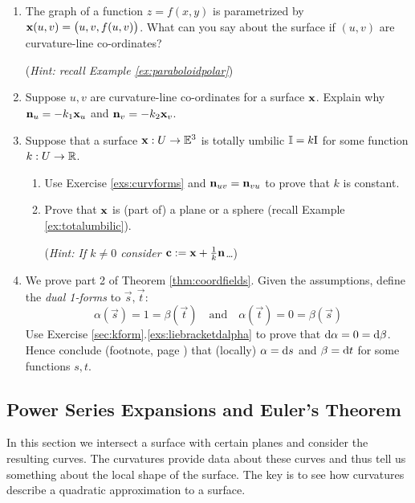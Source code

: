\begin{exercises}{}{}
\begin{enumerate}
		  
	  \item The graph of a function $z=f(x,y)$ is parametrized by ${\mathbf{x}}(u,v)=\bigl(u,v,f(u,v)\bigr)$. What can you say about the surface if $(u,v)$ are curvature-line co-ordinates?\par
	  (\emph{Hint: recall Example \ref{ex:paraboloidpolar}})
	  
	  
	  \item\label{exs:curvforms} Suppose $u,v$ are curvature-line co-ordinates for a surface ${\mathbf{x}}$. Explain why ${\mathbf{n}}_u=-k_1{\mathbf{x}}_u$ and ${\mathbf{n}}_v=-k_2{\mathbf{x}}_v$.
	
	
		\item\label{exs:totallyumbilic} Suppose that a surface ${\mathbf{x}}:U\to\mathbb{E}^3$ is totally umbilic $\mathbb{I}=k\mathrm{I}$ for some function $k:U\to\mathbb{R}$.
		\begin{enumerate}
		  \item Use Exercise \ref{exs:curvforms} and ${\mathbf{n}}_{uv}={\mathbf{n}}_{vu}$ to prove that $k$ is constant.
		  \item Prove that ${\mathbf{x}}$ is (part of) a plane or a sphere (recall Example \ref{ex:totalumbilic}).\par
		  (\emph{Hint: If $k\neq 0$ consider ${\mathbf{c}}:={\mathbf{x}}+\frac 1k{\mathbf{n}}$\ldots})
		\end{enumerate}
	
	
		\item\label{exs:coordfields} We prove part 2 of Theorem \ref{thm:coordfields}. Given the assumptions, define the \emph{dual 1-forms} to $\vec s,\vec t$:
	  \[
	  	\alpha(\vec s)=1=\beta(\vec t) \quad\text{and}\quad \alpha(\vec t)=0=\beta(\vec s)
	  \]
	  Use Exercise \ref*{sec:kform}.\ref{exs:liebracketdalpha} to prove that $\mathrm{d}\alpha=0=\mathrm{d}\beta$. Hence conclude  (footnote, page \pageref{fn:poincare}) that (locally) $\alpha={\mathrm{d} s}$ and $\beta={\mathrm{d} t}$ for some functions $s,t$.
	
	\end{enumerate}
\end{exercises}

\clearpage



\subsection{Power Series Expansions and Euler's Theorem}\label{sec:eulersthm}

In this section we intersect a surface with certain planes and consider the resulting curves. The curvatures provide data about these curves and thus tell us something about the local shape of the surface. The key is to see how curvatures describe a quadratic approximation to a surface.\par

